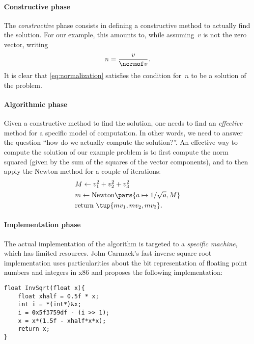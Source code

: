 \paragraph*{Constructive phase}
The \emph{constructive} phase consists in defining a constructive method to actually find the solution.
For our example, this amounts to, while assuming~$v$ is not the zero vector, writing
\begin{equation}
    \label{eq:normalization}
    n=\frac{v}{\normof v}.
\end{equation}
It is clear that \cref{eq:normalization} satisfies the condition for~$n$ to be a solution of the problem.
\paragraph*{Algorithmic phase}
Given a constructive method to find the solution, one needs to find an \emph{effective} method for a specific model of computation.
In other words, we need to answer the question ``how do we actually compute the solution?''.
An effective way to compute the solution of our example problem is to first compute the norm squared (given by the sum of the squares of the vector components), and to then apply the Newton method for a couple of iterations:
\begin{equation}
    \label{eq:newton_normalization}
    \begin{aligned}
         & M\leftarrow v_1^2+v_2^2+v_3^2 \\
         & m\leftarrow \text{Newton}\pars{a\mapsto 1/\sqrt{a},M} \\
         & \text{return }\tup{mv_1,mv_2,mv_3}.
    \end{aligned}
\end{equation}
%

\paragraph*{Implementation phase}
The actual implementation of the algorithm is targeted to a \emph{specific machine}, which has limited resources.
John Carmack's fast inverse square root implementation uses particularities about the bit representation of floating point numbers and integers in x86 and proposes the following implementation:

\begin{center}
    \begin{verbatim}
float InvSqrt(float x){
    float xhalf = 0.5f * x;
    int i = *(int*)&x;
    i = 0x5f3759df - (i >> 1);
    x = x*(1.5f - xhalf*x*x);
    return x;
}
    \end{verbatim}
\end{center}

